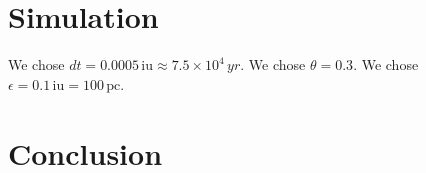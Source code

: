 \documentclass[fleqn,usenatbib]{mnras}
\begin{document}
\section{Simulation}\label{sec:simulation}
We chose $dt = 0.0005 \,\text{iu} \approx 7.5 \times 10^4 \,yr$. We chose $\theta=0.3$. We chose $\epsilon=0.1 \,\text{iu} = 100 \,\text{pc}$.



\section{Conclusion}\label{sec:conclusion}



 


\label{lastpage}
\end{document}
